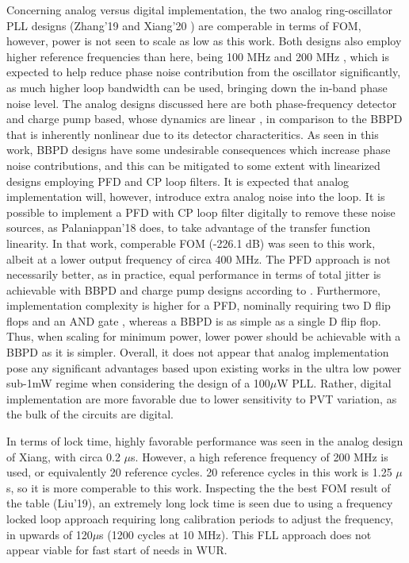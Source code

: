 Concerning analog versus digital implementation, the two analog ring-oscillator PLL designs (Zhang'19 \cite{Zhang2019} and Xiang'20 \cite{Xiang2020}) are comperable in terms of FOM, however, power is not seen to scale as low as this work. Both designs also employ higher reference frequencies than here, being 100 MHz \cite{Zhang2019} and 200 MHz \cite{Xiang2020}, which is expected to help reduce phase noise contribution from the oscillator significantly, as much higher loop bandwidth can be used, bringing down the in-band phase noise level. The analog designs discussed here are both phase-frequency detector and charge pump based, whose dynamics are linear \cite{Razavi2020}, in comparison to the BBPD that is inherently nonlinear due to its detector characteritics. As seen in this work, BBPD designs have some undesirable consequences which increase phase noise contributions, and this can be mitigated to some extent with linearized designs employing PFD and CP loop filters. It is expected that analog implementation will, however, introduce extra analog noise into the loop. It is possible to implement a PFD with CP loop filter digitally to remove these noise sources, as Palaniappan'18 \cite{Palaniappan2018} does, to take advantage of the transfer function linearity. In that work, comperable FOM (-226.1 dB) was seen to this work, albeit at a lower output frequency of circa 400 MHz. The PFD approach is not necessarily better, as in practice, equal performance in terms of total jitter is achievable with BBPD and charge pump designs according to \cite{xu_abidi_2017}. Furthermore, implementation complexity is higher for a PFD, nominally requiring two D flip flops and an AND gate \cite{Razavi2020}, whereas a BBPD is as simple as a single D flip flop. Thus, when scaling for minimum power, lower power should be achievable with a BBPD as it is simpler. Overall, it does not appear that analog implementation pose any significant advantages based upon existing works in the ultra low power sub-1mW regime when considering the design of a 100$\mu$W PLL. Rather, digital implementation are more favorable due to lower sensitivity to PVT variation, as the bulk of the circuits are digital.

In terms of lock time, highly favorable performance was seen in the analog design of Xiang, with circa 0.2 $\mu$s. However, a high reference frequency of 200 MHz is used, or equivalently 20 reference cycles. 20 reference cycles in this work is 1.25 $\mu$s, so it is more comperable to this work. Inspecting the the best FOM result of the table (Liu'19), an extremely long lock time is seen due to using a frequency locked loop approach requiring long calibration periods to adjust the frequency, in upwards of 120$\mu$s (1200 cycles at 10 MHz). This FLL approach does not appear viable for fast start of needs in WUR.

